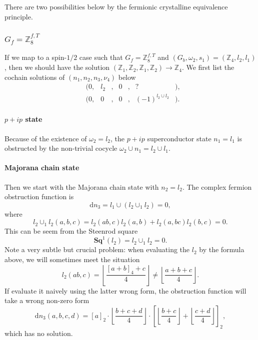 \documentclass[%
 reprint,
 amsmath,amssymb,
 aps,
prb,
]{revtex4-2}
\begin{document}
There are two possibilities below by the fermionic crystalline equivalence principle.

\subsubsection{$G_f = \mathbb Z_8^{f,T}$}

If we map to a spin-$1/2$ case such that $G_f = \mathbb Z_8^{f,T}$ and $(G_b, \omega_2, s_1) = (\mathbb Z_4, l_2, l_1)$, then we should have the solution $(\mathbb Z_1, \mathbb Z_2, \mathbb Z_1, \mathbb Z_2) \rightarrow \mathbb Z_4$.
We first list the cochain solutions of $(n_1, n_2, n_3, \nu_4)$ below 
\begin{align}
&(0 ,& l_2 &, & 0 &,& ? &) ,\\
&(0 ,& 0 &, & 0 &,& (-1)^{l_2 \cup l_2} &) .
\end{align}

\paragraph{$p+ip$ state}
Because of the existence of $\omega_2 = l_2$, the $p+ip$ superconductor state $n_1 = l_1$ is obstructed by the non-trivial cocycle $\omega_2 \cup n_1 = l_2 \cup l_1$.

\paragraph{Majorana chain state}
Then we start with the Majorana chain state with $n_2 = l_2$.
The complex fermion obstruction function is 
\begin{equation}
\mathrm{d} n_3 = l_1 \cup (l_2 \cup_1 l_2) = 0,
\end{equation}
where 
\begin{equation}
l_{2} \cup _{1} l_{2}( a,b,c) =l_{2}( ab,c) l_{2}( a,b) +l_{2}( a,bc) l_{2}( b,c) = 0.
\end{equation}
This can be seem from the Steenrod square
\begin{equation}
\mathbf {Sq}^1(l_{2}) = l_2 \cup_1 l_2 = 0.
\end{equation}
Note a very subtle but crucial problem: when evaluating the $l_2$ by the formula above, we will sometimes meet the situation  
\begin{equation}
l_2(ab, c) = \left\lfloor \frac{[a + b]_4 + c}{4} \right\rfloor \neq \left\lfloor \frac{a + b + c}{4} \right\rfloor .
\end{equation}
If evaluate it naively using the latter wrong form, the obstruction function will take a wrong non-zero form
\begin{equation}
\mathrm{d} n_3 (a, b, c, d) = [a]_2 \cdot \left\lfloor \frac{b+c+d}{4} \right\rfloor \cdot [\left\lfloor \frac{b+c}{4} \right\rfloor + \left\lfloor \frac{c+d}{4} \right\rfloor]_2 ,
\end{equation}
which has no solution.
\end{document}
